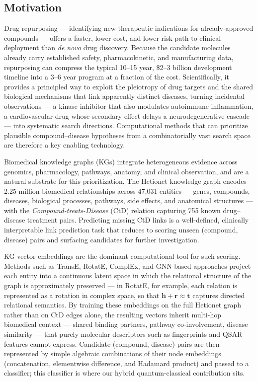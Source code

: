 \documentclass[twocolumn,10pt]{article}
\begin{document}
\subsection{Motivation}

Drug repurposing --- identifying new therapeutic indications for already-approved compounds --- offers a faster, lower-cost, and lower-risk path to clinical deployment than \textit{de novo} drug discovery. Because the candidate molecules already carry established safety, pharmacokinetic, and manufacturing data, repurposing can compress the typical 10--15 year, \$2--3 billion development timeline into a 3--6 year program at a fraction of the cost. Scientifically, it provides a principled way to exploit the pleiotropy of drug targets and the shared biological mechanisms that link apparently distinct diseases, turning incidental observations --- a kinase inhibitor that also modulates autoimmune inflammation, a cardiovascular drug whose secondary effect delays a neurodegenerative cascade --- into systematic search directions. Computational methods that can prioritize plausible compound--disease hypotheses from a combinatorially vast search space are therefore a key enabling technology.

Biomedical knowledge graphs (KGs) integrate heterogeneous evidence across genomics, pharmacology, pathways, anatomy, and clinical observation, and are a natural substrate for this prioritization. The Hetionet knowledge graph \cite{himmelstein2017} encodes 2.25 million biomedical relationships across 47,031 entities --- genes, compounds, diseases, biological processes, pathways, side effects, and anatomical structures --- with the \textit{Compound-treats-Disease} (CtD) relation capturing 755 known drug--disease treatment pairs. Predicting missing CtD links is a well-defined, clinically interpretable link prediction task that reduces to scoring unseen (compound, disease) pairs and surfacing candidates for further investigation.

KG vector embeddings are the dominant computational tool for such scoring. Methods such as TransE, RotatE, ComplEx, and GNN-based approaches project each entity into a continuous latent space in which the relational structure of the graph is approximately preserved --- in RotatE, for example, each relation is represented as a rotation in complex space, so that $\mathbf{h}+\mathbf{r}\approx\mathbf{t}$ captures directed relational semantics. By training these embeddings on the full Hetionet graph rather than on CtD edges alone, the resulting vectors inherit multi-hop biomedical context --- shared binding partners, pathway co-involvement, disease similarity --- that purely molecular descriptors such as fingerprints and QSAR features cannot express. Candidate (compound, disease) pairs are then represented by simple algebraic combinations of their node embeddings (concatenation, elementwise difference, and Hadamard product) and passed to a classifier; this classifier is where our hybrid quantum-classical contribution sits.
\end{document}
